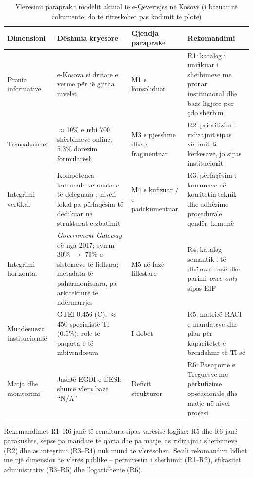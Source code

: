 \documentclass[conference]{IEEEtran}
\begin{document}
\begin{table}[!t]
\caption{Vlerësimi paraprak i modelit aktual të e-Qeverisjes në Kosovë
(i bazuar në dokumente; do të rifreskohet pas kodimit të plotë)}
\label{tab:vleresimi}
\centering
\footnotesize
\renewcommand{\arraystretch}{1.2}
\begin{tabularx}{\textwidth}{L{0.15\textwidth} Y L{0.13\textwidth} Y}
\toprule
\textbf{Dimensioni} & \textbf{Dëshmia kryesore} & \textbf{Gjendja paraprake}
& \textbf{Rekomandimi} \\
\midrule
Prania informative & e-Kosova si dritare e vetme për të gjitha nivelet
\cite{strategjia2023} & M1 e konsoliduar & R1: katalog i unifikuar i
shërbimeve me pronar institucional dhe bazë ligjore për çdo shërbim \\
Transaksionet & $\approx$10\% e mbi 700 shërbimeve online; 5.3\% dorëzim
formularësh \cite{strategjia2023,agjenda2030} & M3 e pjesshme dhe e
fragmentuar & R2: prioritizim i ridizajnit sipas vëllimit të kërkesave,
jo sipas institucionit \\
Integrimi vertikal & Kompetenca komunale vetanake e të deleguara
\cite{ligji03L040}; niveli lokal pa përfaqësim të dedikuar në strukturat e
zbatimit \cite{strategjia2023} & M4 e kufizuar / e padokumentuar & R3:
përfaqësim i komunave në komitetin teknik dhe udhëzime procedurale
qendër--komunë \\
Integrimi horizontal & \textit{Government Gateway} që nga 2017; synim 30\%
$\rightarrow$ 70\% e sistemeve të lidhura; metadata të paharmonizuara, pa
arkitekturë të ndërmarrjes \cite{strategjia2023} & M5 në fazë fillestare &
R4: katalog semantik i të dhënave bazë dhe parimi \textit{once-only} sipas
EIF \cite{eif2017} \\
Mundësuesit institucionalë & GTEI 0.456 (C); $\approx$450 specialistë TI
(0.5\%); role të paqarta e të mbivendosura \cite{strategjia2023} & I dobët &
R5: matricë RACI e mandateve dhe plan për kapacitetet e brendshme të TI-së \\
Matja dhe monitorimi & Jashtë EGDI e DESI; shumë vlera bazë ``N/A''
\cite{undesa2024,agjenda2030,strategjia2023} & Deficit strukturor & R6:
Pasaportë e Treguesve me përkufizime operacionale dhe matje në nivel procesi
\\
\bottomrule
\end{tabularx}
\end{table}

Rekomandimet R1--R6 janë të renditura sipas varësisë logjike: R5 dhe R6 janë
parakushte, sepse pa mandate të qarta dhe pa matje, as ridizajni i shërbimeve
(R2) dhe as integrimi (R3--R4) nuk mund të vlerësohen. Secili rekomandim
lidhet me një dimension të vlerës publike \cite{twizeyimana2019} --
përmirësim i shërbimit (R1--R2), efikasitet administrativ (R3--R5) dhe
llogaridhënie (R6).
\end{document}
